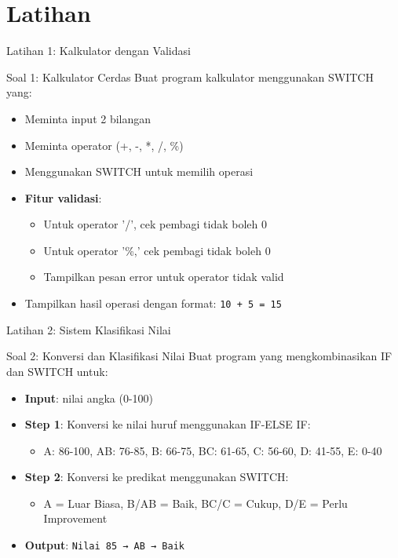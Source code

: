 \documentclass{beamer}
\begin{document}
\section{Latihan}
\begin{frame}{Latihan 1: Kalkulator dengan Validasi}
  \begin{block}{Soal 1: Kalkulator Cerdas}
    Buat program kalkulator menggunakan SWITCH yang:
    \begin{itemize}
      \item Meminta input 2 bilangan
      \item Meminta operator (+, -, *, /, \%)
      \item Menggunakan SWITCH untuk memilih operasi
      \item \textbf{Fitur validasi}:
        \begin{itemize}
          \item Untuk operator '/', cek pembagi tidak boleh 0
          \item Untuk operator '\%,' cek pembagi tidak boleh 0  
          \item Tampilkan pesan error untuk operator tidak valid
        \end{itemize}
      \item Tampilkan hasil operasi dengan format: 
        \texttt{10 + 5 = 15}
    \end{itemize}
  \end{block}
\end{frame}

\begin{frame}{Latihan 2: Sistem Klasifikasi Nilai}
  \begin{block}{Soal 2: Konversi dan Klasifikasi Nilai}
    Buat program yang mengkombinasikan IF dan SWITCH untuk:
    \begin{itemize}
      \item \textbf{Input}: nilai angka (0-100)
      \item \textbf{Step 1}: Konversi ke nilai huruf menggunakan IF-ELSE IF:
        \begin{itemize}
          \item A: 86-100, AB: 76-85, B: 66-75, BC: 61-65, C: 56-60, D: 41-55, E: 0-40
        \end{itemize}
      \item \textbf{Step 2}: Konversi ke predikat menggunakan SWITCH:
        \begin{itemize}
          \item A = Luar Biasa, B/AB = Baik, BC/C = Cukup, D/E = Perlu Improvement
        \end{itemize}
      \item \textbf{Output}: 
        \texttt{Nilai 85 → AB → Baik}
    \end{itemize}
  \end{block}
\end{frame}
\end{document}
